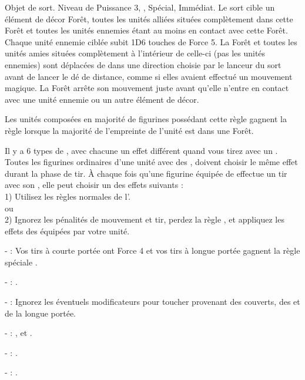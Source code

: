 \armyspecialruleentry{\treesinging}

Objet de sort. Niveau de Puissance 3, , Spécial, Immédiat. Le sort cible un élément de décor Forêt, toutes les unités alliées situées complètement dans cette Forêt et toutes les unités ennemies étant au moins en contact avec cette Forêt. Chaque unité ennemie ciblée subit 1D6 touches de Force 5. La Forêt et toutes les unités amies situées complètement à l'intérieur de celle-ci (pas les unités ennemies) sont déplacées de  dans une direction choisie par le lanceur du sort avant de lancer le dé de distance, comme si elles avaient effectué un mouvement magique. La Forêt arrête son mouvement juste avant qu'elle n'entre en contact avec une unité ennemie ou un autre élément de décor.

\armyspecialruleentry{\emboldeningboughs}

Les unités composées en majorité de figurines possédant cette règle gagnent la règle \stubborn{} lorsque la majorité de l'empreinte de l'unité est dans une Forêt.

\closearmyspecialrules

\vspace*{1.5cm}
\startarmyarmoury

\startitemlistonecol

\listitemonecol{\feyarrows} Il y a 6 types de \feyarrows{}, avec chacune un effet différent quand vous tirez avec un \longbow{}. Toutes les figurines ordinaires d'une unité avec des \feyarrows{}, doivent choisir le même effet durant la phase de tir. À chaque fois qu'une figurine équipée de \feyarrows{} effectue un tir avec son \longbow{}, elle peut choisir un des effets suivants :\\
1) Utilisez les règles normales de l'\longbow{}.\\
ou\\
2) Ignorez les pénalités de mouvement et tir, perdez la règle \volleyfire{}, et appliquez les effets des \feyarrows{} équipées par votre unité.\\

	\begin{customsubitemize}
	\item[-] \textbf{\blackarrow{}} : Vos tirs à courte portée ont Force 4 et vos tirs à longue portée gagnent la règle spéciale .
	\item[-] \textbf{\hawthornpoint{}} : \poisonedattacks.
	\item[-] \textbf{\truemarkarrow{}} : Ignorez les éventuels modificateurs pour toucher provenant des couverts, des \skirmishers{} et de la longue portée.
	\item[-] \textbf{\starlightshaft{}} : \divineattacks{}, \flamingattacks{} et \magicalattacks{}.
	\item[-] \textbf{\perforatingtip{}} : .
	\item[-] \textbf{\jewelweedshot{}} : .
	\end{customsubitemize}

